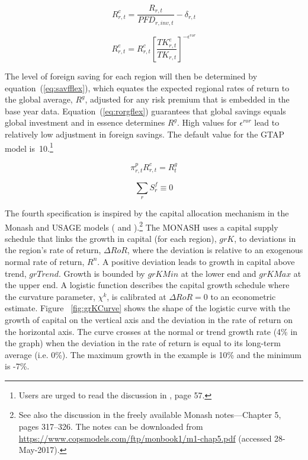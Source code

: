 \documentclass[11pt,letterpaper]{report}
\begin{document}
\begin{equation}
\label{eq:rorc}
R^c_{r,t} = \frac {R_{r,t}} {\mathit{PFD}_{r,\mathit{inv},t}} - \delta_{r,t}
\end{equation}

\begin{equation}
\label{eq:roreGTAP}
R^e_{r,t} =
   R^c_{r,t} \left[\frac{\mathit{TK}^e_{r,t}}{\mathit{TK}_{r,t}}
             \right]^{-\epsilon^{\mathit{ror}}}
\end{equation}

The level of foreign saving for each region will then be determined by
equation~(\ref{eq:savfflex}), which equates the expected regional rates of
return to the global average, $R^g$, adjusted for any risk premium that is
embedded in the base year data. Equation~(\ref{eq:rorgflex}) guarantees that
global savings equals global investment and in essence determines $R^g$. High
values for $\epsilon^{\mathit{ror}}$ lead to relatively low adjustment in
foreign savings. The default value for the GTAP model
is~10.\footnote{Users are urged to read the discussion in \cite{Hertel1997},
page 57.}

\begin{equation}
\label{eq:savfflex}
\pi^p_{r,t}R^c_{r,t} = R^g_t
\end{equation}

\begin{equation}
\label{eq:rorgflex}
\sum_r{S^f_r} \equiv 0
\end{equation}

The fourth specification is inspired by the capital allocation mechanism in the
Monash and USAGE models (\cite{DixonRimmer2002} and
\cite{DixonRimmer2005}).\footnote{See also the discussion in the freely
available Monash notes---Chapter 5, pages 317--326. The notes can be downloaded
from \url{https://www.copsmodels.com/ftp/monbook1/m1-chap5.pdf}
(accessed 28-May-2017).} The  MONASH uses a capital supply schedule that links
the growth in capital (for each region), $\mathit{grK}$, to deviations in the
region's rate of return, ${\Delta\mathit{RoR}}$, where the deviation is relative
to  an exogenous normal rate of return, $R^n$. A positive deviation leads to
growth in capital above trend, $\mathit{grTrend}$. Growth is bounded by
$\mathit{grKMin}$ at the lower end and $\mathit{grKMax}$ at the upper end.
A logistic function describes the capital growth schedule where the curvature
parameter, $\chi^k$, is calibrated at ${\Delta\mathit{RoR}}=0$ to an econometric
estimate. Figure ~\ref{fig:grKCurve} shows the shape of the logistic curve with
the growth of capital on the vertical axis and the deviation in the rate of
return on the horizontal axis. The curve crosses at the normal or trend growth
rate (4\% in the graph) when the deviation in the rate of return is equal to its
long-term average (i.e. 0\%). The maximum growth in the example is 10\% and the
minimum is -7\%.
\end{document}
